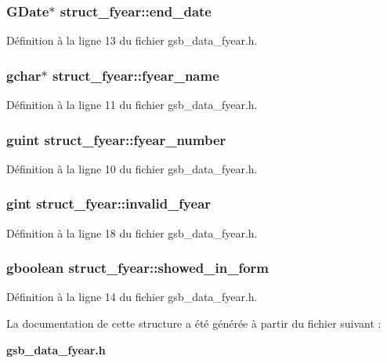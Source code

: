 \subsubsection[{end\_\-date}]{\setlength{\rightskip}{0pt plus 5cm}GDate$\ast$ {\bf struct\_\-fyear::end\_\-date}}\label{structstruct__fyear_a3b1ad69439f04dc9cddf59c86292e1d5}


Définition à la ligne 13 du fichier gsb\_\-data\_\-fyear.h.

\subsubsection[{fyear\_\-name}]{\setlength{\rightskip}{0pt plus 5cm}gchar$\ast$ {\bf struct\_\-fyear::fyear\_\-name}}\label{structstruct__fyear_a0d34f596bcabf40bc54458ff737b99c8}


Définition à la ligne 11 du fichier gsb\_\-data\_\-fyear.h.

\subsubsection[{fyear\_\-number}]{\setlength{\rightskip}{0pt plus 5cm}guint {\bf struct\_\-fyear::fyear\_\-number}}\label{structstruct__fyear_a7306938422360b90439d78ab9f85b643}


Définition à la ligne 10 du fichier gsb\_\-data\_\-fyear.h.

\subsubsection[{invalid\_\-fyear}]{\setlength{\rightskip}{0pt plus 5cm}gint {\bf struct\_\-fyear::invalid\_\-fyear}}\label{structstruct__fyear_ac79c99fc9a43d85fafbd0eb40461ebb7}


Définition à la ligne 18 du fichier gsb\_\-data\_\-fyear.h.

\subsubsection[{showed\_\-in\_\-form}]{\setlength{\rightskip}{0pt plus 5cm}gboolean {\bf struct\_\-fyear::showed\_\-in\_\-form}}\label{structstruct__fyear_a316464a83f0ecacf6b7a96eefb064edc}


Définition à la ligne 14 du fichier gsb\_\-data\_\-fyear.h.



La documentation de cette structure a été générée à partir du fichier suivant :\begin{DoxyCompactItemize}
\item 
{\bf gsb\_\-data\_\-fyear.h}\end{DoxyCompactItemize}

